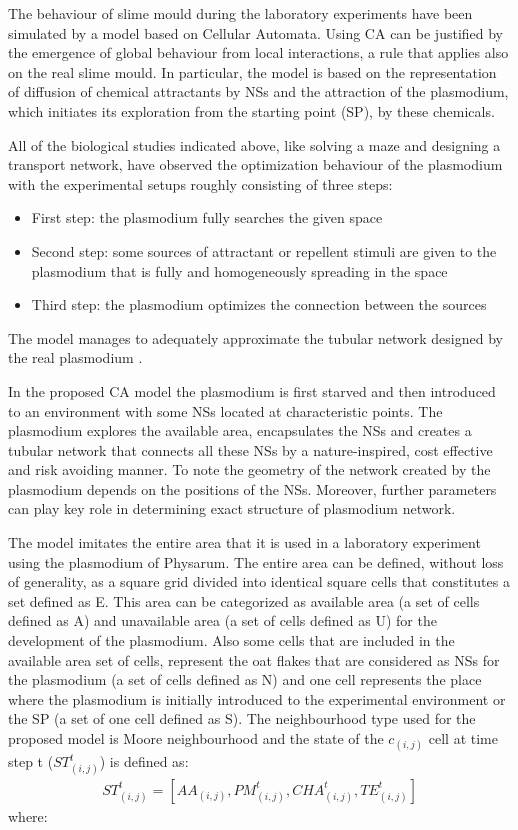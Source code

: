 The behaviour of slime mould during the laboratory experiments have been simulated by a model based on Cellular Automata. Using CA can be justified by the emergence of global behaviour from local interactions, a rule that applies also on the real slime mould.
In particular, the model is based on the representation of diffusion of chemical attractants by NSs and the attraction of the plasmodium, which initiates its exploration from the starting point (SP), by these chemicals. 
\par
All of the biological studies indicated above, like solving a maze and designing a transport network, have observed the optimization behaviour of the plasmodium with the experimental setups roughly consisting of three steps:
\begin{itemize}
	\item First step: the plasmodium fully searches the given space
	\item Second step: some sources of attractant or repellent stimuli are given to the plasmodium that is fully and homogeneously spreading in the space
	\item Third step: the plasmodium optimizes the connection between the sources
\end{itemize}

The model manages to adequately approximate the tubular network designed by the real plasmodium \cite{shirakawa2015construction}.

In the proposed CA model \cite{Tsompanas2016} the plasmodium is first starved and then introduced to an environment with some NSs located at characteristic points. The plasmodium explores the available area, encapsulates the NSs and creates a tubular network that connects all these NSs by a nature-inspired, cost effective and risk avoiding manner. To note the geometry of the network created by the plasmodium depends on the positions of the NSs. Moreover, further parameters can play key role in determining exact structure of plasmodium network.
\par
The model imitates the entire area that it is used in a laboratory experiment using the plasmodium of Physarum. The entire area can be defined, without loss of generality, as a square grid divided into identical square cells that constitutes a set defined as E. This area can be categorized as available area (a set of cells defined as A) and unavailable area (a set of cells defined as U) for the development of the plasmodium.
Also some cells that are included in the available area set of cells, represent the oat flakes that are considered as NSs for the plasmodium (a set of cells defined as N) and one cell represents the place where the plasmodium is initially introduced to the
experimental environment or the SP (a set of one cell defined as S). 
The neighbourhood type used for the proposed model is Moore neighbourhood and the state of the $c_{(i, j)}$ cell at time step t ($ ST^t_{(i, j)}$) is defined as:
\begin{align}
ST^t_{(i, j)} = [AA_{(i, j)}, PM^t_{(i, j)}, CHA^t_{(i, j)}, TE^t_{(i, j)}]
\end{align}
where:

